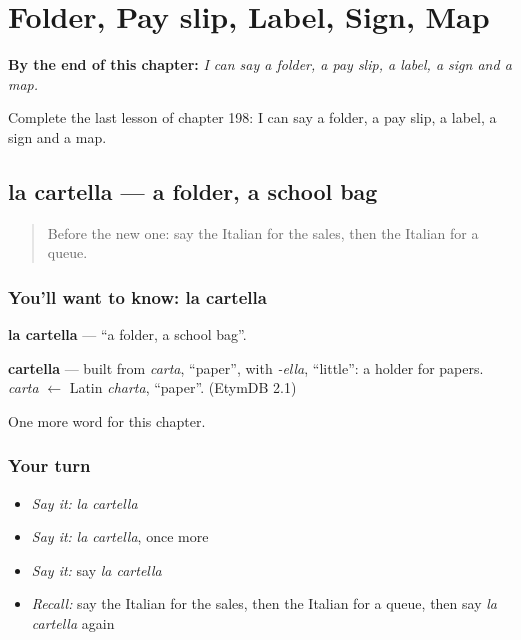 
\chapter{Folder, Pay slip, Label, Sign, Map}
\label{ch:it-folder-pay-slip-label-sign-map}

\begin{chapteropening}
\textbf{By the end of this chapter:} \emph{I can say a folder, a pay slip, a label, a sign and a map.}

Complete the last lesson of chapter 198: I can say a folder, a pay slip, a label, a sign and a map.
\end{chapteropening}

\section[la cartella]{la cartella — a folder, a school bag}

\label{lesson:IT-C198-cartella}



\begin{quote}
Before the new one: say the Italian for the sales, then the Italian for a queue.
\end{quote}

\subsection*{You'll want to know: la cartella}
\textbf{la cartella} — \textquotedblleft{}a folder, a school bag\textquotedblright{}.

\begin{cousinweb}
\textbf{cartella} — built from \emph{carta}, \textquotedblleft{}paper\textquotedblright{}, with \emph{-ella}, \textquotedblleft{}little\textquotedblright{}: a holder for papers. \emph{carta} $\leftarrow$ Latin \emph{charta}, \textquotedblleft{}paper\textquotedblright{}. (EtymDB 2.1)
\end{cousinweb}

\begin{grammarlens}[title={What you've built}]
One more word for this chapter.
\end{grammarlens}

\subsection*{Your turn}
\begin{itemize}
\raggedright
  \item \emph{Say it:} \emph{la cartella}
  \item \emph{Say it:} \emph{la cartella}, once more
  \item \emph{Say it:} say \emph{la cartella}
  \item \emph{Recall:} say the Italian for the sales, then the Italian for a queue, then say \emph{la cartella} again
\end{itemize}

